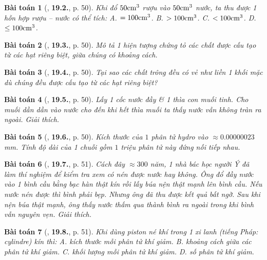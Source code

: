 \documentclass{article}
\numberwithin{equation}{section}
\newtheorem{baitoan}{Bài toán}
\begin{document}
\begin{baitoan}[\cite{SBT_Vat_Ly_8}, \textbf{19.2.}, p. 50]
	Khi đổ $50{\rm cm}^3$ rượu vào $50{\rm cm}^3$ nước, ta thu được 1 hỗn hợp rượu -- nước có thể tích: {\sf A.} $= 100{\rm cm}^3$. {\sf B.} $> 100{\rm cm}^3$. {\sf C.} $< 100{\rm cm}^3$. {\sf D.} $\le100{\rm cm}^3$.
\end{baitoan}

\begin{baitoan}[\cite{SBT_Vat_Ly_8}, \textbf{19.3.}, p. 50]
	Mô tả 1 hiện tượng chứng tỏ các chất được cấu tạo từ các hạt riêng biệt, giữa chúng có khoảng cách.
\end{baitoan}

\begin{baitoan}[\cite{SBT_Vat_Ly_8}, \textbf{19.4.}, p. 50]
	Tại sao các chất trông đều có vẻ như liền 1 khối mặc dù chúng đều được cấu tạo từ các hạt riêng biệt?
\end{baitoan}

\begin{baitoan}[\cite{SBT_Vat_Ly_8}, \textbf{19.5.}, p. 50]
	Lấy 1 cốc nước đầy \& 1 thìa con muối tinh. Cho muối dần dần vào nước cho đến khi hết thìa muối ta thấy nước vẫn không tràn ra ngoài. Giải thích.
\end{baitoan}

\begin{baitoan}[\cite{SBT_Vat_Ly_8}, \textbf{19.6.}, p. 50]
	Kích thước của $1$ phân tử hydro vào $\approx0.00000023$\emph{mm}. Tính độ dài của 1 chuỗi gồm $1$ triệu phân tử này đứng nối tiếp nhau.
\end{baitoan}

\begin{baitoan}[\cite{SBT_Vat_Ly_8}, \textbf{19.7.}, p. 51]
	Cách đây $\approx300$ năm, 1 nhà bác học người Ý đã làm thí nghiệm để kiểm tra xem có nén được nước hay không. Ông đổ đầy nước vào 1 bình cầu bằng bạc hàn thật kín rồi lấy búa nện thật mạnh lên bình cầu. Nếu nước nén được thì bình phải bẹp. Nhưng ông đã thu được kết quả bất ngờ. Sau khi nện búa thật mạnh, ông thấy nước thấm qua thành bình ra ngoài trong khi bình vẫn nguyên vẹn. Giải thích.
\end{baitoan}

\begin{baitoan}[\cite{SBT_Vat_Ly_8}, \textbf{19.8.}, p. 51]
	Khi dùng piston né khí trong 1 xi lanh (tiếng Pháp: \emph{cylindre}) kín thì: {\sf A.} kích thước mỗi phân tử khí giảm. {\sf B.} khoảng cách giữa các phân tử khí giảm. {\sf C.} khối lượng mỗi phân tử khí giảm. {\sf D.} số phân tử khí giảm.
\end{baitoan}
\end{document}
